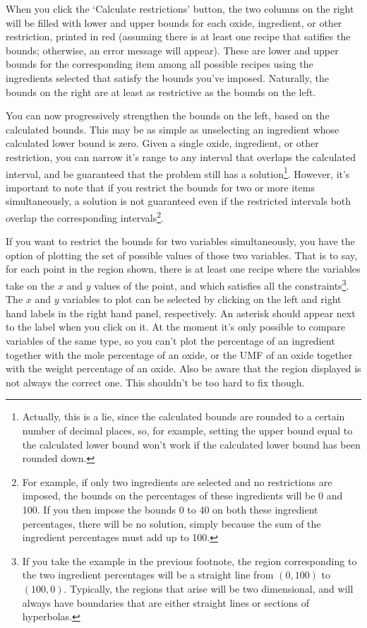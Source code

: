 \documentclass[a4paper,10pt]{article}
\begin{document}
When you click the `Calculate restrictions' button, the two columns on the right will be filled with lower and upper bounds for each oxide, ingredient, or other restriction, printed in red (assuming there is at least one recipe that satifies the bounds; otherwise, an error message will appear). These are lower and upper bounds for the corresponding item among all possible recipes using the ingredients selected that satisfy the bounds you've imposed. Naturally, the bounds on the right are at least as restrictive as the bounds on the left.

You can now progressively strengthen the bounds on the left, based on the calculated bounds. This may be as simple as unselecting an ingredient whose calculated lower bound is zero. Given a single oxide, ingredient, or other restriction, you can narrow it's range to any interval that overlaps the calculated interval, and be guaranteed that the problem still has a solution\footnote{Actually, this is a lie, since the calculated bounds are rounded to a certain number of decimal places, so, for example, setting the upper bound equal to the calculated lower bound won't work if the calculated lower bound has been rounded down.}. However, it's important to note that if you restrict the bounds for two or more items simultaneously, a solution is not guaranteed even if the restricted intervals both overlap the corresponding intervals\footnote{For example, if only two ingredients are selected and no restrictions are imposed, the bounds on the percentages of these ingredients will be 0 and 100. If you then impose the bounds 0 to 40 on both these ingredient percentages, there will be no solution, simply because the sum of the ingredient percentages must add up to 100.}.

If you want to restrict the bounds for two variables simultaneously, you have the option of plotting the set of possible values of those two variables. That is to say, for each point in the region shown, there is at least one recipe where the variables take on the $x$ and $y$ values of the point, and which satisfies all the constraints\footnote{If you take the example in the previous footnote, the region corresponding to the two ingredient percentages will be a straight line from $(0,100)$ to $(100,0)$. Typically, the regions that arise will be two dimensional, and will always have boundaries that are either straight lines or sections of hyperbolas.}. The $x$ and $y$ variables to plot can be selected by clicking on the left and right hand labels in the right hand panel, respectively. An asterisk should appear next to the label when you click on it. At the moment it's only possible to compare variables of the same type, so you can't plot the percentage of an ingredient together with the mole percentage of an oxide, or the UMF of an oxide together with the weight percentage of an oxide. Also be aware that the region displayed is not always the correct one. This shouldn't be too hard to fix though.
\end{document}

